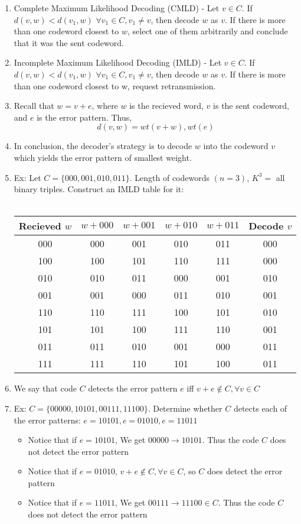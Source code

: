 \documentclass[11pt]{article}
\begin{document}
	\begin{enumerate}
		\item Complete Maximum Likelihood Decoding (CMLD) -  Let
		$v \in C.$ If $d(v,w) < d(v_1,w)$  $\forall v_1 \in C, v_1 \not= v$, then decode $w$ as $v$. If there is more than one codeword closest to $w$, select one of them arbitrarily and conclude that it was the
		sent codeword.
		\item Incomplete Maximum Likelihood Decoding (IMLD) -  Let
		$v \in C.$ If $d(v,w) < d(v_1,w)$  $\forall v_1 \in C, v_1 \not= v$, then decode $w$ as $v$. If there is more than one codeword closest to w, request retransmission.
		\item Recall that $w = v + e$, where $w$ is the recieved word, $v$ is the sent codeword, and $e$ is the error pattern. Thus,
			$$d(v,w) = wt(v+w),wt(e)$$
		\item In conclusion, the decoder’s strategy is to decode $w$ into the codeword $v$ which yields the error pattern of smallest weight.
		\item Ex: Let $C = \{000,001,010,011\}$. Length of codewords $(n = 3)$, $K^3 =$ all binary triples. Construct an IMLD table for it: 
		\\ \\
		\begin{tabular}{|c|c|c|c|c|c|}
			\hline
			Recieved $w$ & $w + 000$ & $w + 001$ & $w + 010$ & $w + 011$ & Decode $v$ \\
			\hline
			000 & 000 & 001 & 010 & 011 & 000 \\
			\hline
			100 & 100 & 101 & 110 & 111 & 000 \\
			\hline
			010 & 010 & 011 & 000 & 001 & 010 \\
			\hline
			001 & 001 & 000 & 011 & 010 & 001 \\
			\hline
			110 & 110 & 111 & 100 & 101 & 010 \\
			\hline
			101 & 101 & 100 & 111 & 110 & 001 \\
			\hline
			011 & 011 & 010 & 001 & 000 & 011 \\
			\hline
			111 & 111 & 110 & 101 & 100 & 011 \\
			\hline
		\end{tabular}
		\newpage 
		\item We say that code $C$ detects the error pattern $e$ iff $v + e \not \in C, \forall v \in C$
		\item Ex: $C = \{00000, 10101, 00111, 11100\}$.  Determine whether $C$ detects each of the error patterns:
		$e = 10101, e = 01010, e = 11011$ 
		\begin{itemize}[label  = -]
			\item Notice that if $e = 10101$, We get $00000 \rightarrow 10101$.  Thus the code $C$ does not detect the error pattern
			\item Notice that if $e = 01010$, $v + e \not \in C, \forall v \in C$, so $C$ does detect the error pattern
			\item Notice that if $e = 11011$, We get $00111 \rightarrow 11100 \in C$.  Thus the code $C$ does not detect the error pattern
		\end{itemize}
	\end{enumerate}
\end{document}
